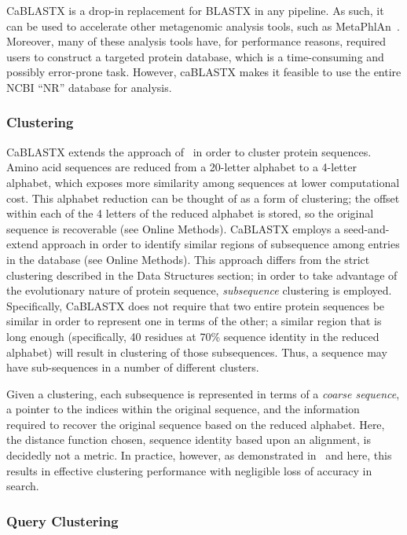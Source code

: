 \documentclass[review,preprint,12pt]{elsarticle}
\renewcommand{\cite}{\citep} %
\theoremstyle{definition}
\theoremstyle{remark}
\numberwithin{equation}{section}
\begin{document}
CaBLASTX is a drop-in replacement for BLASTX in any pipeline.
As such, it can be used to accelerate other metagenomic analysis tools, such
as MetaPhlAn~\cite{segata2012metagenomic}.
Moreover, many of these analysis tools have, for performance reasons, required
users to construct a targeted protein database, which is a time-consuming and
possibly error-prone task.
However, caBLASTX makes it feasible to use the entire NCBI ``NR'' database for
analysis.

\subsubsection{Clustering}

CaBLASTX extends the approach of~\cite{daniels2013compressive} in order to 
cluster protein sequences.
Amino acid sequences are reduced from a 20-letter alphabet to a 4-letter
alphabet, which exposes more similarity among sequences at lower computational
cost.
This alphabet reduction can be thought of as a form of clustering; the offset 
within each of the 4 letters of the reduced alphabet is stored, so the original
sequence is recoverable (see Online Methods).
CaBLASTX employs a seed-and-extend approach in order to identify similar regions
of subsequence among entries in the database (see Online Methods).
This approach differs from the strict clustering described in the Data 
Structures section; in order to take advantage of the evolutionary nature of
protein sequence, \emph{subsequence} clustering is employed.
Specifically, CaBLASTX does not require that two entire protein sequences be 
similar in order to represent one in terms of the other; a similar region that 
is long enough (specifically, 40 residues at 70\% sequence identity in the 
reduced alphabet) will result in clustering of those subsequences. 
Thus, a sequence may have sub-sequences in a number of different clusters.

Given a clustering, each subsequence is represented in terms of a 
\emph{coarse sequence}, a pointer to the indices within the original sequence,
and the information required to recover the original sequence based on the
reduced alphabet.
Here, the distance function chosen, sequence identity based upon an alignment,
is decidedly not a metric.
In practice, however, as demonstrated in~\cite{daniels2013compressive} and 
here, this results in effective clustering performance with negligible loss of 
accuracy in search.

\subsubsection{Query Clustering}
\end{document}
